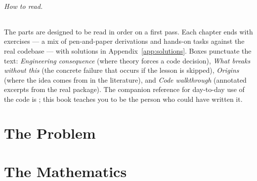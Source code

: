 \documentclass[11pt,openany]{book}
\begin{document}
\paragraph{How to read.} The parts are designed to be read in order on a
first pass. Each chapter ends with exercises --- a mix of pen-and-paper
derivations and hands-on tasks against the real codebase --- with solutions in
Appendix~\ref{app:solutions}. Boxes punctuate the text:
\emph{Engineering consequence} (where theory forces a code decision),
\emph{What breaks without this} (the concrete failure that occurs if the
lesson is skipped), \emph{Origins} (where the idea comes from in the
literature), and \emph{Code walkthrough} (annotated excerpts from the real
package). The companion reference for day-to-day use of the code is
; this book teaches you to be the person who
could have written it.

\tableofcontents

\mainmatter

\part{The Problem}\label{part:problem}





\part{The Mathematics}\label{part:math}








\appendix


\end{document}
